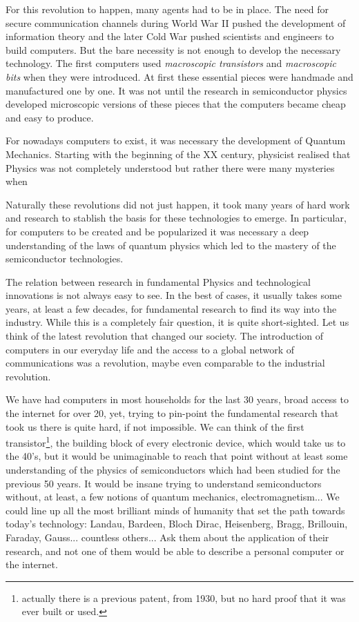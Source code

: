 For this revolution to happen, many agents had to be in place. The need for secure communication channels during World War II pushed the development of information theory and the later Cold War pushed scientists and engineers to build computers. But the bare necessity is not enough to develop the necessary technology. The first computers used \emph{macroscopic transistors} and \emph{macroscopic bits} when they were introduced. At first these essential pieces were handmade and manufactured one by one. It was not until the research in semiconductor physics developed microscopic versions of these pieces that the computers became cheap and easy to produce.
\medbreak

\newpage
For nowadays computers to exist, it was necessary the development of Quantum Mechanics. Starting with the beginning of the XX century, physicist realised that Physics was not completely understood but rather there were many mysteries when 



Naturally these revolutions did not just happen, it took many years of hard work and research to stablish the basis for these technologies to emerge. In particular, for computers to be created and be popularized it was necessary a deep understanding of the laws of quantum physics which led to the mastery of the semiconductor technologies.



\newpage

The relation between research in fundamental Physics and technological innovations is not always easy to see. In the best of cases, it usually takes some years, at least a few decades, for fundamental research to find its way into the industry.
While this is a completely fair question, it is quite short-sighted. Let us think of the latest revolution that changed our society.
The introduction of computers in our everyday life and the access to a global network of communications was a revolution, maybe even comparable to the industrial revolution.

We have had computers in most households for the last 30 years, broad access to the internet for over 20, yet, trying to pin-point the fundamental research that took us there is quite hard, if not impossible.
We can think of the first transistor\footnote{actually there is a previous patent, from 1930,\cite{diode} but no hard proof that it was ever built or used.},
the building block of every electronic device, which would take us to the 40's\cite{Ross}, but it would be unimaginable to reach that point without at least some understanding of the physics of semiconductors which had been studied for the previous 50 years. It would be insane trying to understand semiconductors without, at least, a few notions of quantum mechanics, electromagnetism...
We could line up all the most brilliant minds of humanity that set the path towards today's technology: Landau, Bardeen, Bloch Dirac, Heisenberg, Bragg, Brillouin, Faraday, Gauss... countless others... Ask them about the application of their research, and not one of them would be able to describe a personal computer or the internet.

